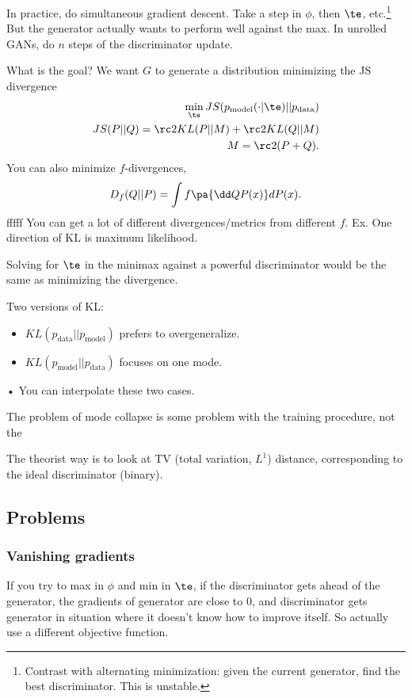 In practice, do simultaneous gradient descent. Take a step in $\phi$, then $\te$, etc.\footnote{Contrast with alternating minimization: given the current generator, find the best discriminator. This is unstable. 
}
 But the %
generator actually wants to perform well against the max.  In unrolled GANs, do $n$ steps of the discriminator update.

What is the goal? We want $G$ to generate a distribution minimizing the JS divergence
\begin{align}
\min_\te JS(p_{\text{model}}(\cdot |\te)||p_{\text{data}})\\
JS(P||Q) =\rc 2KL(P||M) + \rc2 KL(Q||M)\\
M=\rc2 (P+Q).
\end{align}
You can also minimize $f$-divergences,
$$
D_f (Q||P) = \int f\pa{\dd QP(x)}dP(x).
$$fffff
You can get a lot of different divergences/metrics from different $f$.
Ex. One direction of KL is maximum likelihood.

Solving for $\te$ in the minimax against a powerful discriminator would be the same as minimizing the divergence.

Two versions of KL:
\begin{itemize}
\item
$KL(p_{\text{data}}||p_{\text{model}})$ prefers to overgeneralize. 
\item
$KL(p_{\text{model}}||p_{\text{data}})$ focuses on one mode.
\end{itemize}•
You can interpolate these two cases.

The problem of mode collapse is some problem with the training procedure, not the

The theorist way is to look at TV (total variation, $L^1$) distance, corresponding to the ideal discriminator (binary).

\subsection{Problems}
\subsubsection{Vanishing gradients}
If you try to max in $\phi$ and min in $\te$, if the discriminator gets ahead of the generator, the
 gradients of generator are close to 0, and discriminator gets generator in situation where it doesn't know how to improve itself. So actually use a different objective function.
 

